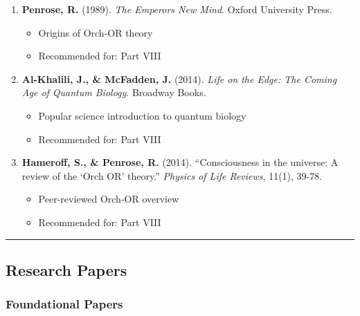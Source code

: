\begin{enumerate}
\def\labelenumi{\arabic{enumi}.}
\setcounter{enumi}{13}
\tightlist
\item
  \textbf{Penrose, R.} (1989). \emph{The Emperor\textquotesingle s New
  Mind}. Oxford University Press.

  \begin{itemize}
  \tightlist
  \item
    Origins of Orch-OR theory
  \item
    Recommended for: Part VIII
  \end{itemize}
\item
  \textbf{Al-Khalili, J., \& McFadden, J.} (2014). \emph{Life on the
  Edge: The Coming Age of Quantum Biology}. Broadway Books.

  \begin{itemize}
  \tightlist
  \item
    Popular science introduction to quantum biology
  \item
    Recommended for: Part VIII
  \end{itemize}
\item
  \textbf{Hameroff, S., \& Penrose, R.} (2014). ``Consciousness in the
  universe: A review of the `Orch OR' theory.'' \emph{Physics of Life
  Reviews}, 11(1), 39-78.

  \begin{itemize}
  \tightlist
  \item
    Peer-reviewed Orch-OR overview
  \item
    Recommended for: Part VIII
  \end{itemize}
\end{enumerate}

\begin{center}\rule{0.5\linewidth}{0.5pt}\end{center}

\subsection{\texorpdfstring{ Research
Papers}{ Research Papers}}\label{research-papers}

\subsubsection{Foundational Papers}\label{foundational-papers}

